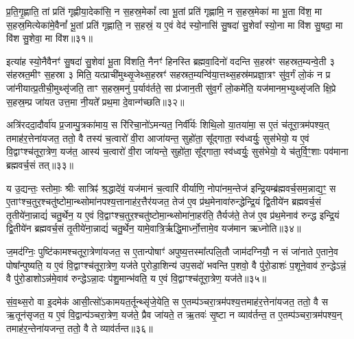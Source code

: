प्र॒ति॒गृ॒ह्णाति॒ तां प्रति॑ गृह्णीया॒देका॑सि॒ न स॒हस्र॒मेकां᳚ त्वा भू॒तां प्रति॑ गृह्णामि॒ न स॒हस्र॒मेका॑ मा भू॒ता वि॑श॒ मा स॒हस्र॒मित्येका॑मे॒वैनां᳚ भू॒तां प्रति॑ गृह्णाति॒ न स॒हस्रं॒ य ए॒वं वेद॑ स्यो॒नासि॑ सु॒षदा॑ सु॒शेवा᳚ स्यो॒ना मा वि॑श सु॒षदा॒ मा वि॑श सु॒शेवा॒ मा वि॑श॥३१॥

इत्या॑ह स्यो॒नैवैनꣳ॑ सु॒षदा॑ सु॒शेवा॑ भू॒ता वि॑शति॒ नैनꣳ॑ हिनस्ति ब्रह्मवा॒दिनो॑ वदन्ति स॒हस्र॑ꣳ सहस्रत॒म्यन्वे॒ती ३ स॑हस्रत॒मीꣳ स॒हस्रा ३ मिति॒ यत्प्राची॑मुथ्सृ॒जेथ्स॒हस्रꣳ॑ सहस्रत॒म्यन्वि॑या॒त्तथ्स॒हस्र॑मप्रज्ञा॒त्रꣳ सु॑व॒र्गं लो॒कं न प्र जा॑नीयात्प्र॒तीची॒मुथ्सृ॑जति॒ ताꣳ स॒हस्र॒मनु॑ प॒र्याव॑र्तते॒ सा प्र॑जान॒ती सु॑व॒र्गं लो॒कमे॑ति॒ यज॑मानम॒भ्युथ्सृ॑जति क्षि॒प्रे स॒हस्र॒म्प्र जा॑यत उत्त॒मा नी॒यते᳚ प्रथ॒मा दे॒वान्ग॑च्छति॥३२॥

{\anuvakamend[{लो॒कान्ग॑मयति॒ सावि॑द्वान्थ्सु॒शेवा॒ मावि॑श॒ यज॑मान॒न्द्वाद॑श च॥७॥}]}

अत्रि॑रददा॒दौर्वा॑य प्र॒जाम्पु॒त्रका॑माय॒ स रि॑रिचा॒नो॑\-ऽमन्यत॒ निर्वी᳚र्यः शिथि॒लो या॒तया॑मा॒ स ए॒तं च॑तूरा॒त्रम॑पश्य॒त् तमाह॑र॒त्तेना॑यजत॒ ततो॒ वै तस्य॑ च॒त्वारो॑ वी॒रा आजा॑यन्त॒ सुहो॑ता॒ सू᳚द्गाता॒ स्व॑ध्वर्युः॒ सुस॑भेयो॒ य ए॒वं वि॒द्वाꣳश्च॑तूरा॒त्रेण॒ यज॑त॒ आस्य॑ च॒त्वारो॑ वी॒रा जा॑यन्ते॒ सुहो॑ता॒ सू᳚द्गाता॒ स्व॑ध्वर्युः॒ सुस॑भेयो॒ ये च॑तुर्वि॒ꣳ॒शाः पव॑माना ब्रह्मवर्च॒सं तत्॥३३॥

य उ॒द्यन्तः॒ स्तोमाः॒ श्रीः सात्रिꣴ॑ श्र॒द्धादे॑वं॒ यज॑मानं च॒त्वारि॑ वीर्याणि॒ नोपा॑नम॒न्तेज॑ इन्द्रि॒यम्ब्र॑ह्मवर्च॒सम॒न्नाद्य॒ꣳ॒ स ए॒ताꣳश्च॒तुर॒श्चतु॑ष्टोमा॒न्थ्सोमा॑नपश्य॒त्तानाह॑र॒त्तैर॑यजत॒ तेज॑ ए॒व प्र॑थ॒मेनावा॑रुन्द्धेन्द्रि॒यं द्वि॒तीये॑न ब्रह्मवर्च॒सं तृ॒तीये॑ना॒न्नाद्यं॑ चतु॒र्थेन॒ य ए॒वं वि॒द्वाꣳश्च॒तुर॒श्चतु॑ष्टोमा॒न्थ्सोमा॑ना॒हर॑ति॒ तैर्यज॑ते॒ तेज॑ ए॒व प्र॑थ॒मेनाव॑ रुन्द्ध इन्द्रि॒यं द्वि॒तीये॑न ब्रह्मवर्च॒सं तृ॒तीये॑ना॒न्नाद्यं॑ चतु॒र्थेन॒ यामे॒वात्रि॒र्\mbox{}ऋद्धि॒मार्ध्नो॒त्तामे॒व यज॑मान ऋध्नोति॥३४॥

{\anuvakamend[{तत्तेज॑ ए॒वाष्टाद॑श च॥८॥}]}

ज॒मद॑ग्निः॒ पुष्टि॑कामश्चतूरा॒त्रेणा॑यजत॒ स ए॒तान्पोषाꣳ॑ अपुष्य॒त्तस्मा᳚त्पलि॒तौ जाम॑दग्नियौ॒ न सं जा॑नाते ए॒ताने॒व पोषा᳚न्पुष्यति॒ य ए॒वं वि॒द्वाꣳश्च॑तूरा॒त्रेण॒ यज॑ते पुरोडा॒शिन्य॑ उप॒सदो॑ भवन्ति प॒शवो॒ वै पु॑रो॒डाशः॑ प॒शूने॒वाव॑ रु॒न्द्धे\-ऽन्नं॒ वै पु॑रो॒डाशो\-ऽन्न॑मे॒वाव॑ रुन्द्धे\-ऽन्ना॒दः प॑शु॒मान्भ॑वति॒ य ए॒वं वि॒द्वाꣳश्च॑तूरा॒त्रेण॒ यज॑ते॥३५॥

{\anuvakamend[{ज॒मद॑ग्निर॒ष्टाच॑त्वारिꣳशत्॥९॥}]}

सं॒व॒थ्स॒रो वा इ॒दमेक॑ आसी॒त्सो॑\-ऽकामयत॒र्तून्थ्सृ॑जे॒येति॒ स ए॒तम्प॑ञ्चरा॒त्रम॑पश्य॒त्तमाह॑र॒त्तेना॑यजत॒ ततो॒ वै स ऋ॒तून॑सृजत॒ य ए॒वं वि॒द्वान्प॑ञ्चरा॒त्रेण॒ यज॑ते॒ प्रैव जा॑यते॒ त ऋ॒तवः॑ सृ॒ष्टा न व्याव॑र्तन्त॒ त ए॒तम्प॑ञ्चरा॒त्रम॑पश्य॒न् तमाह॑र॒न्तेना॑यजन्त॒ ततो॒ वै ते व्याव॑र्तन्त॥३६॥

